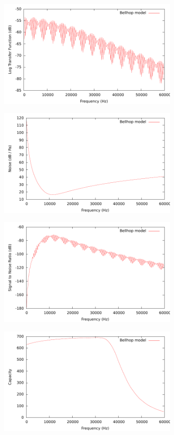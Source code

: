 \documentclass[a4paper]{IEEEtran}
\begin{document}
\begin{figure}
\centering
\includegraphics[width=3.5in]{../postprocessing/logh00.pdf}
\end{figure}

\begin{figure}
\centering
\includegraphics[width=3.5in]{../postprocessing/noise00.pdf}
\end{figure}

\begin{figure}
\centering
\includegraphics[width=3.5in]{../postprocessing/sig2noise00.pdf}
\end{figure}

\begin{figure}
\centering
\includegraphics[width=3.5in]{../postprocessing/capacity00.pdf}
\end{figure}
\end{document}
